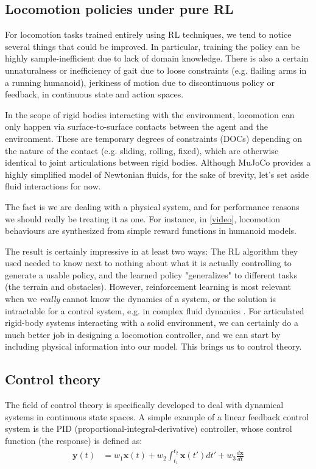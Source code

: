 \documentclass{article}
\newcommand{\bvec}[1]{\boldsymbol{#1}}
\begin{document}
\subsection{Locomotion policies under pure RL}
For locomotion tasks trained entirely using RL techniques, we tend to notice several things that could be improved. In particular, training the policy can be highly sample-inefficient due to lack of domain knowledge. There is also a certain unnaturalness or inefficiency of gait due to loose constraints (e.g. flailing arms in a running humanoid), jerkiness of motion due to discontinuous policy or feedback, in continuous state and action spaces.

In the scope of rigid bodies interacting with the environment, locomotion can only happen via surface-to-surface contacts between the agent and the environment. These are temporary degrees of constraints (DOCs) depending on the nature of the contact (e.g. sliding, rolling, fixed), which are otherwise identical to joint articulations between rigid bodies. Although MuJoCo provides a highly simplified model of Newtonian fluids, for the sake of brevity, let's set aside fluid interactions for now.

The fact is we are dealing with a physical system, and for performance reasons we should really be treating it as one. For instance, in \cite{heess2017emergence} [\href{https://www.youtube.com/watch?v=hx_bgoTF7bs}{video}], locomotion behaviours are synthesized from simple reward functions in humanoid models.

The result is certainly impressive in at least two ways: The RL algorithm they used needed to know next to nothing about what it is actually controlling to generate a usable policy, and the learned policy "generalizes" to different tasks (the terrain and obstacles). However, reinforcement learning is most relevant when we \textit{really} cannot know the dynamics of a system, or the solution is intractable for a control system, e.g. in complex fluid dynamics \cite{mit6832}. For articulated rigid-body systems interacting with a solid environment, we can certainly do a much better job in designing a locomotion controller, and we can start by including physical information into our model. This brings us to control theory.

\subsection{Control theory}
The field of control theory is specifically developed to deal with dynamical systems in continuous state spaces. A simple example of a linear feedback control system is the PID (proportional-integral-derivative) controller, whose control function (the response) is defined as:
\begin{align*}
\bvec{y}(t) &= w_1 \bvec{x}(t) + w_2\int_{t_1}^{t_2} \bvec{x}(t') dt' + w_3 \frac{d\bvec{x}}{dt}
\end{align*}
\end{document}
